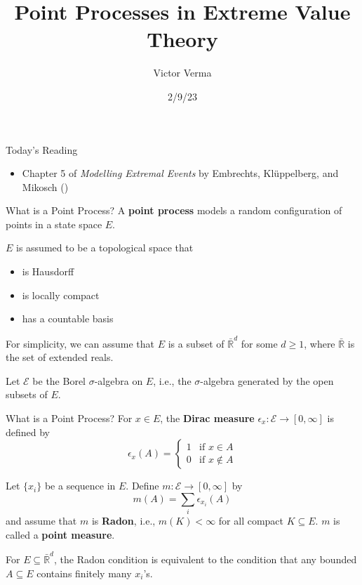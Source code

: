 \documentclass{beamer}
\title[Point Processes in Extreme Value Theory]{Point Processes in Extreme Value Theory}
\author{Victor Verma}
\institute[]
{
Prof. Yang Chen's Reading Group \\
Department of Statistics \\
University of Michigan
}
\date[2/9/23]{2/9/23}
\begin{document}
\begin{frame}
    \titlepage
\end{frame}

\begin{frame}{Today's Reading}
    \begin{itemize}
        \item Chapter 5 of \textit{Modelling Extremal Events} by Embrechts, Kl\"{u}ppelberg, and Mikosch (\cite{embrechts_et_al_1997})
    \end{itemize}
\end{frame}



\begin{frame}{What is a Point Process?}
    A \textbf{point process} models a random configuration of points in a state space $E$.

    \smallskip

    $E$ is assumed to be a topological space that
    \begin{itemize}
        \item is Hausdorff
        \item is locally compact
        \item has a countable basis
    \end{itemize}
    For simplicity, we can assume that $E$ is a subset of $\bar{\mathbb{R}}^d$ for some $d \ge 1$, where $\bar{\mathbb{R}}$ is the set of extended reals.

    \smallskip
    
    Let $\mathcal{E}$ be the Borel $\sigma$-algebra on $E$, i.e., the $\sigma$-algebra generated by the open subsets of $E$.
\end{frame}

\begin{frame}{What is a Point Process?}
    For $x \in E$, the \textbf{Dirac measure} $\epsilon_x : \mathcal{E} \to [0, \infty]$ is defined by
    \[
    \epsilon_x(A) =
        \begin{cases}
             1 & \text{if $x \in A$} \\
             0 & \text{if $x \notin A$}
        \end{cases}
    \]

    \smallskip

    Let $\{x_i\}$ be a sequence in $E$. Define $m : \mathcal{E} \to [0, \infty]$ by
    \[
    m(A) = \sum_i \epsilon_{x_i}(A)
    \]
    and assume that $m$ is \textbf{Radon}, i.e., $m(K) < \infty$ for all compact $K \subseteq E$. $m$ is called a \textbf{point measure}.

    \smallskip

    For $E \subseteq \bar{\mathbb{R}}^d$, the Radon condition is equivalent to the condition that any bounded $A \subseteq E$ contains finitely many $x_i$'s.
\end{frame}
\end{document}
